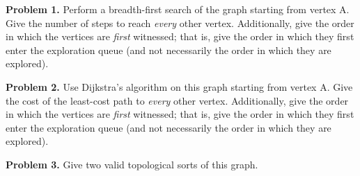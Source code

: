 \documentclass{article}
\begin{document}

\vspace*{5mm}\par\textbf{Problem 1.} Perform a breadth-first search of the graph starting from vertex A.  Give the number of steps to reach \emph{every} other vertex.  Additionally, give the order in which the vertices are \emph{first} witnessed; that is, give the order in which they first enter the exploration queue (and not necessarily the order in which they are explored).\par


\vspace*{10mm}\par\textbf{Problem 2.} Use Dijkstra's algorithm on this graph starting from vertex A.  Give the cost of the least-cost path to \emph{every} other vertex.  Additionally, give the order in which the vertices are \emph{first} witnessed; that is, give the order in which they first enter the exploration queue (and not necessarily the order in which they are explored).\par


\vspace*{10mm}\par\textbf{Problem 3.} Give two valid topological sorts of this graph.\par

\end{document}
